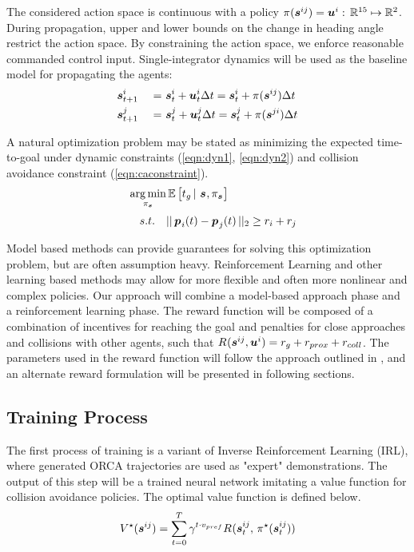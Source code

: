 \documentclass[conference]{IEEEtran}
\begin{document}
The considered action space is continuous with a policy $\pi_{}(\boldsymbol{s}^{ij}_{})=\boldsymbol{u}^{i}_{\,} : \, \mathbb{R}^{15}\mapsto\mathbb{R}^2$.  During propagation, upper and lower bounds on the change in heading angle restrict the action space. By constraining the action space, we enforce reasonable commanded control input. Single-integrator dynamics will be used as the baseline model for propagating the agents: 
\begin{alignat}{3}
& \state{i}{t+1} & \ = \ & \state{i}{t} + \ctrl{i}{t}\dt = \state{i}{t} + \policy{}(\state{ij}{})\dt \label{eqn:dyn1} \\
& \state{j}{t+1} & \ = \ &\state{j}{t} + \ctrl{j}{t}\dt = \state{j}{t} + \policy{}(\state{ji}{})\dt \label{eqn:dyn2} 
\end{alignat}

A natural optimization problem may be stated as minimizing the expected time-to-goal under dynamic constraints (\ref{eqn:dyn1}, \ref{eqn:dyn2}) and collision avoidance constraint (\ref{eqn:caconstraint}).
\begin{alignat}{3}
    && \argmin\limits_{\policy{\state{}{}}} & \expectation \left[t_g \, | \ \state{}{}, \policy{\state{}{}}  \right] \\
    && s.t. \quad & \norm{\posvec{i}(t) - \posvec{j}(t)}_2 \geq \radius{i} + \radius{j} \label{eqn:caconstraint}
\end{alignat}

Model based methods can provide guarantees for solving this optimization problem, but are often assumption heavy. Reinforcement Learning  and other learning based methods may allow for more flexible and often more nonlinear and complex policies. 
Our approach will combine a model-based approach phase and a reinforcement learning phase.
The reward function will be composed of a combination of incentives for reaching the goal and penalties for close approaches and collisions with other agents, such that $R_{}(\boldsymbol{s}^{ij}_{},\boldsymbol{u}^{i}_{})=r_{g}+r_{prox}+r_{coll}$. The parameters used in the reward function will follow the approach outlined in \cite{chen2017cadrl}, and an alternate reward formulation will be presented in following sections.
\subsection{Training Process}
The first process of training is a variant of Inverse Reinforcement Learning (IRL), where generated ORCA trajectories are used as "expert" demonstrations. The output of this step will be a trained neural network imitating a value function for collision avoidance policies. The optimal value function is defined below.
\begin{equation}
V^{\star}(\boldsymbol{s}^{ij}_{})=\sum_{t=0}^T \gamma^{t\cdot v_{pref}}R_{}(\boldsymbol{s}^{ij}_{t}, \, \pi_{}^{\star}(\boldsymbol{s}^{ij}_{t}))
\end{equation}
\end{document}
